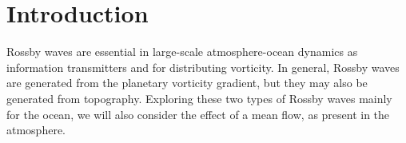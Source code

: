 \section{Introduction}
\label{sec:introduction}
Rossby waves are essential in large-scale atmosphere-ocean dynamics as information transmitters and for distributing vorticity. In general, Rossby waves are generated from the planetary vorticity gradient, but they may also be generated from topography. Exploring these two types of Rossby waves mainly for the ocean, we will also consider the effect of a mean flow, as present in the atmosphere.
